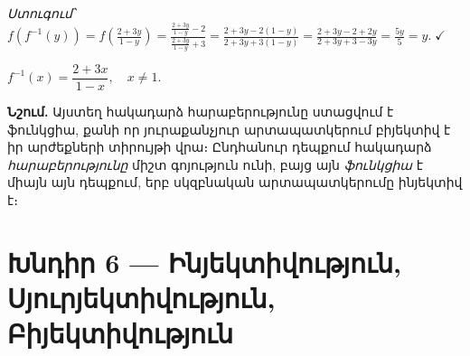 \documentclass[12pt, a4paper]{article}
\begin{document}
\emph{Ստուգում՝}\;
$f(f^{-1}(y)) = f\!\left(\frac{2+3y}{1-y}\right)
= \frac{\frac{2+3y}{1-y} - 2}{\frac{2+3y}{1-y} + 3}
= \frac{2+3y - 2(1-y)}{2+3y + 3(1-y)}
= \frac{2+3y-2+2y}{2+3y+3-3y}
= \frac{5y}{5} = y.\;\checkmark$

\begin{answerbox}
$f^{-1}(x) = \dfrac{2+3x}{1-x}, \quad x \neq 1.$
\end{answerbox}

\bigskip
\textbf{Նշում.}\; Այստեղ հակադարձ հարաբերությունը ստացվում է ֆունկցիա, քանի որ յուրաքանչյուր արտապատկերում բիյեկտիվ է իր արժեքների տիրույթի վրա։ Ընդհանուր դեպքում հակադարձ \emph{հարաբերությունը} միշտ գոյություն ունի, բայց այն \emph{ֆունկցիա} է միայն այն դեպքում, երբ սկզբնական արտապատկերումը ինյեկտիվ է։

\newpage
\section{Խնդիր 6 — Ինյեկտիվություն, Սյուրյեկտիվություն, Բիյեկտիվություն}
\end{document}
